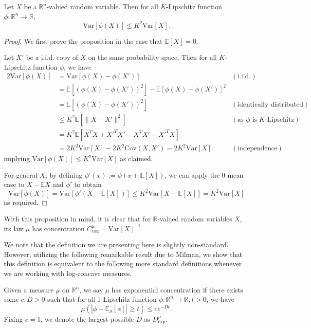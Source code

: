 \begin{proposition}\label{prop:concentration}
  Let \(X\) be a \(\mathbb{R}^n\)-valued random variable. Then for all \(K\)-Lipschitz function 
  \(\phi : \mathbb{R}^n \to \mathbb{R}\),
  \[\text{Var}[\phi(X)] \le K^2 \text{Var}[X].\]
\end{proposition}
\begin{proof}
  We first prove the proposition in the case that \(\mathbb{E}[X] = 0\). 

  Let \(X'\) be a i.i.d. copy of \(X\) on the same probability space. Then for all \(K\)-Lipschitz 
  function \(\phi\), we have 
  \begin{align*}
    2 \text{Var}[\phi(X)] & = \text{Var}[\phi(X) - \phi(X')] & (\text{i.i.d.})\\
      & = \mathbb{E}[(\phi(X) - \phi(X'))^2] - \mathbb{E}[\phi(X) - \phi(X')]^2 & \\
      & = \mathbb{E}[(\phi(X) - \phi(X'))^2] & (\text{identically distributed}) \\
      & \le K^2 \mathbb{E}[\|X - X'\|^2] & (\text{as \(\phi\) is \(K\)-Lipschitz}) \\
      & = K^2 \mathbb{E}[X^T X + X'^T X' - X^T X' - X'^T X] & \\
      & = 2K^2 \text{Var}[X] - 2K^2 \text{Cov}(X, X') = 2K^2 \text{Var}[X]. & (\text{independence})
  \end{align*}
  implying \(\text{Var}[\phi(X)] \le K^2 \text{Var}[X]\) as claimed.

  For general \(X\), by defining \(\phi'(x) := \phi(x + \mathbb{E}[X])\), we can apply the 0 mean 
  case to \(X - \mathbb{E}X\) and \(\phi'\) to obtain
  \[\text{Var}[\phi(X)] = \text{Var}[\phi'(X - \mathbb{E}[X])] \le 
    K^2 \text{Var}[X - \mathbb{E}[X]] = K^2 \text{Var}[X]\]
  as required.
\end{proof}

With this proposition in mind, it is clear that for \(\mathbb{R}\)-valued random variables \(X\), 
its law \(\mu\) has concentration \(C^\mu_{\text{con}} = \text{Var}[X]^{-1}\). 

We note that the definition we are presenting here is slightly non-standard. However, utilizing the 
following remarkable result due to Milman, we show that this definition is equivalent to the following 
more standard definitions whenever we are working with log-concave measures.

\begin{definition}
  Given a measure \(\mu\) on \(\mathbb{R}^n\), we say \(\mu\) has exponential concentration if 
  there exists some \(c, D > 0\) such that for all 1-Lipschitz function 
  \(\phi : \mathbb{R}^n \to \mathbb{R}, t > 0\), we have
  \begin{equation}
    \mu(|\phi - \mathbb{E}_\mu[\phi]| \ge t) \le c e^{-Dt}.
  \end{equation}
  Fixing \(c = 1\), we denote the largest possible \(D\) as \(D^\mu_{\text{exp}}\).
\end{definition}

